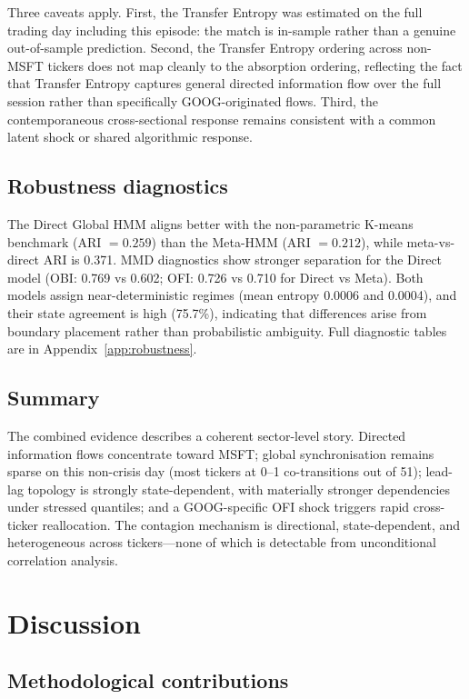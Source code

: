 \documentclass{article}
\begin{document}
Three caveats apply. First, the Transfer Entropy was estimated on the full
trading day including this episode: the match is in-sample rather than a
genuine out-of-sample prediction. Second, the Transfer Entropy ordering across
non-MSFT tickers does not map cleanly to the absorption ordering, reflecting
the fact that Transfer Entropy captures general directed information flow over
the full session rather than specifically GOOG-originated flows. Third, the
contemporaneous cross-sectional response remains consistent with a common
latent shock or shared algorithmic response.

\subsection{Robustness diagnostics}

The Direct Global HMM aligns better with the non-parametric K-means benchmark
(ARI $= 0.259$) than the Meta-HMM (ARI $= 0.212$), while meta-vs-direct ARI
is 0.371. MMD diagnostics show stronger separation for the Direct model
(OBI: 0.769 vs 0.602; OFI: 0.726 vs 0.710 for Direct vs Meta). Both models
assign near-deterministic regimes (mean entropy 0.0006 and 0.0004), and their
state agreement is high (75.7\%), indicating that differences arise from
boundary placement rather than probabilistic ambiguity. Full diagnostic tables
are in Appendix~\ref{app:robustness}.

\subsection{Summary}

The combined evidence describes a coherent sector-level story. Directed
information flows concentrate toward MSFT; global synchronisation remains
sparse on this non-crisis day (most tickers at 0--1 co-transitions out of 51);
lead-lag topology is strongly state-dependent, with materially stronger
dependencies under stressed quantiles; and a GOOG-specific OFI shock triggers
rapid cross-ticker reallocation. The contagion mechanism is directional,
state-dependent, and heterogeneous across tickers---none of which is detectable
from unconditional correlation analysis.

\section{Discussion}
\label{sec:discuss}

\subsection{Methodological contributions}
\end{document}
